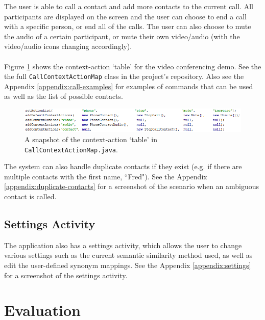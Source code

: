 \documentclass[11pt]{article}
\begin{document}
The user is able to call a contact and add more contacts to the current call. All participants are displayed on the screen and the user can choose to end a call with a specific person, or end all of the calls. The user can also choose to mute the audio of a certain participant, or mute their own video/audio (with the video/audio icons changing accordingly).
\\
\\
Figure \ref{fig:call-context-action-map} shows the context-action `table' for the video conferencing demo. See the the full \texttt{CallContextActionMap} class in the project's repository. Also see the Appendix \ref{appendix:call-examples} for examples of commands that can be used as well as the list of possible contacts.

\begin{center}
\begin{figure}[H]
\begin{center}
  \includegraphics[width=\linewidth]{call-context-action-map.png}
  \caption{A snapshot of the context-action `table' in \texttt{CallContextActionMap.java}.}
  \label{fig:call-context-action-map}
  \end{center}
\end{figure}
\end{center}

The system can also handle duplicate contacts if they exist (e.g. if there are multiple contacts with the first name, ``Fred"). See the Appendix \ref{appendix:duplicate-contacts} for a screenshot of the scenario when an ambiguous contact is called.

\subsection{Settings Activity}
\label{section:settings}

The application also has a settings activity, which allows the user to change various settings such as the current semantic similarity method used, as well as edit the user-defined synonym mappings. See the Appendix \ref{appendix:settings} for a screenshot of the settings activity.

\newpage
\section{Evaluation}
\label{evaluation}
\end{document}

